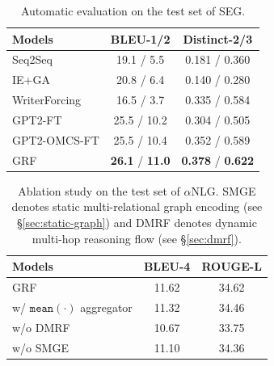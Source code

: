 \documentclass[11pt,a4paper]{article}
\begin{document}
\begin{table}[t]
    \centering
    \small
    \begin{tabular}{l c c}
        \toprule[1.5pt]
        Models & BLEU-1/2 & Distinct-2/3 \\%
        \midrule[1pt]
        Seq2Seq & 19.1 / 5.5 & 0.181 / 0.360 \\%
        IE+GA & 20.8 / 6.4 & 0.140 / 0.280 \\%
        WriterForcing &  16.5 / 3.7 & 0.335 / 0.584 \\ %
        GPT2-FT & 25.5 / 10.2 & 0.304 / 0.505 \\ %
        GPT2-OMCS-FT & 25.5 / 10.4 & 0.352 / 0.589 \\%
        \midrule[0.5pt]
        GRF &  \textbf{26.1} / \textbf{11.0} & \textbf{0.378} / \textbf{0.622} \\ %
        \bottomrule[1.5pt]
    \end{tabular}
    \caption{Automatic evaluation on the test set of SEG.}
    \label{tab:auto-eval-2}
\end{table}

\begin{table}[h]
    \centering
    \small
    \begin{tabular}{l cc}
        \toprule[1.5pt]
        Models & BLEU-4 & ROUGE-L \\
        \midrule[1pt]
        GRF &  11.62 & 34.62 \\
        w/ $\texttt{mean}(\cdot)$ aggregator & 11.32 & 34.46 \\
        w/o {DMRF}  & 10.67 & 33.75 \\
        w/o {SMGE} & 11.10 & 34.36 \\
        \bottomrule[1.5pt]
    \end{tabular}
    \caption{Ablation study on the test set of $\alpha$NLG. {SMGE} denotes static multi-relational graph encoding (see \S{\ref{sec:static-graph}}) and {DMRF} denotes dynamic multi-hop reasoning
    flow (see \S{\ref{sec:dmrf}}).}
    \label{tab:ablation}
\end{table}
\end{document}

